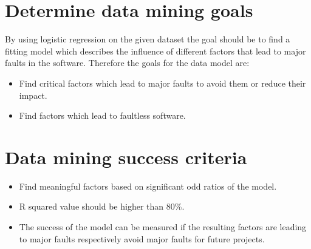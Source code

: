 \section{Determine data mining goals}
By using logistic regression on the given dataset the goal should be to find a fitting model which describes the influence of different factors that lead to major faults in the software. Therefore the goals for the data model are:
\begin{itemize}
	\item Find critical factors which lead to major faults to avoid them or reduce their impact.
	\item Find factors which lead to faultless software.
\end{itemize}

\section{Data mining success criteria}
\begin{itemize}
	\item Find meaningful factors based on significant odd ratios of the model.
	\item R squared value should be higher than 80\%.
	\item The success of the model can be measured if the resulting factors are leading to major faults respectively avoid major faults for future projects.
\end{itemize}
